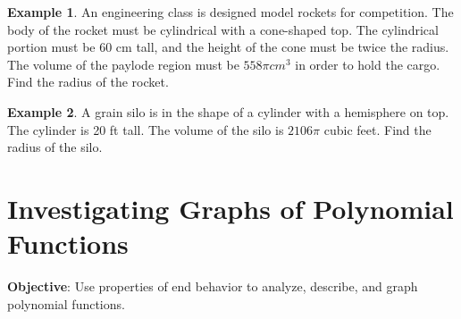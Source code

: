 \documentclass{report}
\theoremstyle{definition}
\newtheorem{example}{\bf Example}
\begin{document}
\vfill

\begin{example}
An engineering class is designed model rockets for competition. The body of the rocket must be cylindrical with a cone-shaped top. The cylindrical portion must be 60 cm tall, and the height of the cone must be twice the radius. The volume of the paylode region must be $558\pi cm^3$ in order to hold the cargo. Find the radius of the rocket. 
\end{example}
\vfill


\begin{example}
A grain silo is in the shape of a cylinder with a hemisphere on top. The cylinder is 20 ft tall. The volume of the silo is $2106\pi$ cubic feet. Find the radius of the silo.
\end{example}


\vfill
\noindent{}
 \newpage


 \section{ Investigating Graphs of Polynomial Functions }
 \indent\hfill\small\noindent \textbf{Objective}: Use properties of end behavior to analyze, describe, and graph polynomial functions. \normalsize\\
 \setcounter{example}{0}
 \setcounter{definition}{0}
\end{document}

